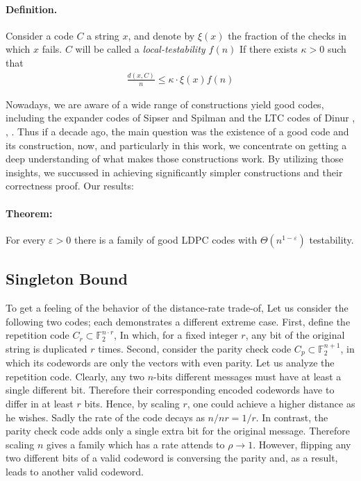 \documentclass[sigplan,screen]{acmart}
\begin{document}
\begin{multicols*}{2}
  \paragraph{Definition.} Consider a code $C$  a string $x$, and denote by $\xi\left( x \right)$ the fraction of the checks in which $x$ fails. $C$ will be called a \textit{local-testability $f\left( n \right)$} If there exists $\kappa > 0$ such that 
  \begin{equation*}
    \begin{split}
      \frac{d\left( x, C \right)}{n} \le \kappa \cdot  \xi\left( x \right) f\left( n \right)
    \end{split}
  \end{equation*}



  Nowadays, we are aware of a wide range of constructions yield good codes, including the expander codes of Sipser and Spilman \cite{ExpanderCodes} and the LTC codes of Dinur \cite{Dinur}, \cite{Pavel}, \cite{leverrier2022quantum}. Thus if a decade ago, the main question was the existence of a good code and its construction, now, and particularly in this work, we concentrate on getting a deep understanding of what makes those constructions work. By utilizing those insights, we succussed in achieving significantly simpler constructions and their correctness proof. Our results: 

  \paragraph{Theorem:} For every $\varepsilon > 0 $ there is a family of good LDPC codes with $\Theta\left( n^{1-\varepsilon} \right)$ testability.     

  \subsection{Singleton Bound}  
  To get a feeling of the behavior of the distance-rate trade-of, Let us consider the following two codes; each demonstrates a different extreme case. First, define the repetition code $C_{r} \subset \mathbb{F}_{2}^{n \cdot r}$, In which, for a fixed integer $r$, any bit of the original string is duplicated $r$ times. Second, consider the parity check code $C_{p} \subset \mathbb{F}_{2}^{n+1}$, in which its codewords are only the vectors with even parity. Let us analyze the repetition code. Clearly, any two $n$-bits different messages must have at least a single different bit. Therefore their corresponding encoded codewords have to differ in at least $r$ bits. Hence, by scaling $r$, one could achieve a higher distance as he wishes. Sadly the rate of the code decays as $n/nr = 1/r$. In contrast, the parity check code adds only a single extra bit for the original message. Therefore scaling $n$ gives a family which has a rate attends to $\rho \rightarrow 1$. However, flipping any two different bits of a valid codeword is conversing the parity and, as a result, leads to another valid codeword.


\end{multicols*}
\end{document}
